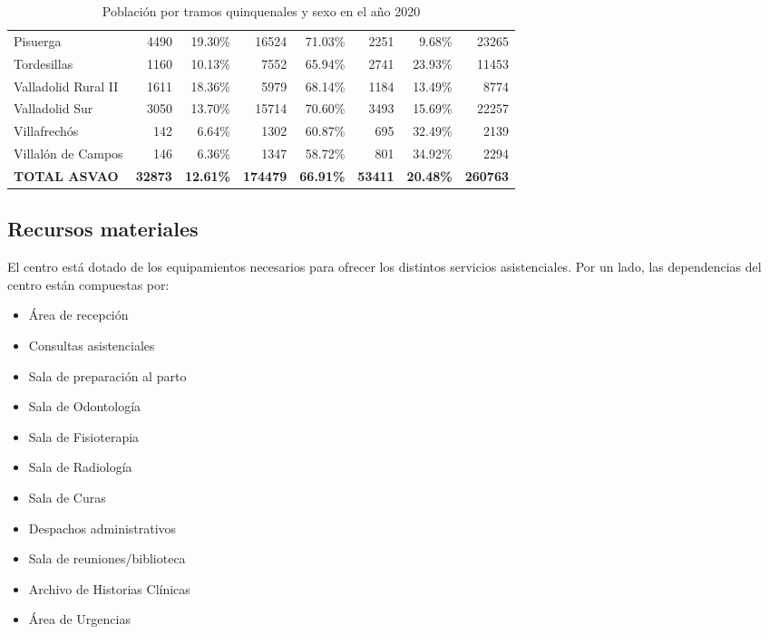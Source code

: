 \begin{table}[H]
\begin{tabular}{lrrrrrrr}
        Pisuerga                 & 4490           & 19.30\%          & 16524           & 71.03\%          & 2251           & 9.68\%           & 23265            \\
        Tordesillas              & 1160           & 10.13\%          & 7552            & 65.94\%          & 2741           & 23.93\%          & 11453            \\
        Valladolid Rural II      & 1611           & 18.36\%          & 5979            & 68.14\%          & 1184           & 13.49\%          & 8774             \\
        Valladolid Sur           & 3050           & 13.70\%          & 15714           & 70.60\%          & 3493           & 15.69\%          & 22257            \\
        Villafrechós             & 142            & 6.64\%           & 1302            & 60.87\%          & 695            & 32.49\%          & 2139             \\
        Villalón de Campos       & 146            & 6.36\%           & 1347            & 58.72\%          & 801            & 34.92\%          & 2294             \\
        \midrule
        \textbf{TOTAL ASVAO}     & \textbf{32873} & \textbf{12.61\%} & \textbf{174479} & \textbf{66.91\%} & \textbf{53411} & \textbf{20.48\%} & \textbf{260763} \\
        \bottomrule
    \end{tabular}
    \caption{Población por tramos quinquenales y sexo en el año 2020}
\end{table}

\subsection{Recursos materiales}

El centro está dotado de los equipamientos necesarios para ofrecer los distintos servicios asistenciales. Por un lado, las dependencias del centro están compuestas por:

\begin{itemize}
    \item Área de recepción
    \item Consultas asistenciales
    \item Sala de preparación al parto
    \item Sala de Odontología
    \item Sala de Fisioterapia
    \item Sala de Radiología
    \item Sala de Curas
    \item Despachos administrativos
    \item Sala de reuniones/biblioteca
    \item Archivo de Historias Clínicas
    \item Área de Urgencias
\end{itemize}

